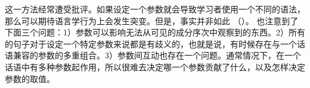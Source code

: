 这一方法经常遭受批评。如果设定一个参数就会导致学习者使用一个不同的语法，那么可以期待语言学行为上会发生突变。但是，事实并非如此 （\citealp[]{Bloom93a}）。 \citet[--344]{Fodor98a} 也注意到了下面三个问题：1）参数可以影响无法从可见的成分序次中观察到的东西。2）所有的句子对于设定一个特定参数来说都是有歧义的，也就是说，有时候存在与一个话语兼容的参数的多重组合\citep{BN96a,Fodor98b}。3）参数间互动也存在一个问题。通常情况下，在一个话语中有多种参数起作用，所以很难去决定哪一个参数贡献了什么，以及怎样决定参数的取值\nocite{Pullum83a}。

